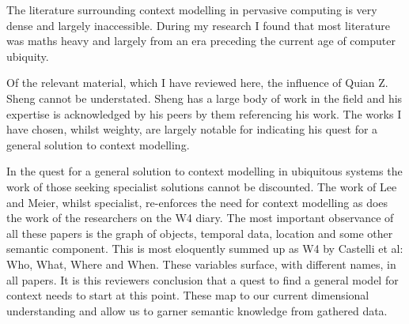 \documentclass[]{report}
\begin{document}
The literature surrounding context modelling in pervasive computing is very dense and largely inaccessible. During my research I found that most literature was maths heavy and largely from an era preceding the current age of computer ubiquity.\par
Of the relevant material, which I have reviewed here, the influence of Quian Z. Sheng cannot be understated. Sheng has a large body of work in the field and his expertise is acknowledged by his peers by them referencing his work. The works I have chosen\cite{6,7,8,9}, whilst weighty, are largely notable for indicating his quest for a general solution to context modelling.\par
In the quest for a general solution to context modelling in ubiquitous systems the work of those seeking specialist solutions cannot be discounted. The work of Lee and Meier\cite{0}, whilst specialist, re-enforces the need for context modelling as does the work of the researchers on the W4 diary\cite{2}. 
The most important observance of all these papers is the graph of objects, temporal data, location and some other semantic component. This is most eloquently summed up as W4 by Castelli et al\cite{2}: Who, What, Where and When. These variables surface, with different names, in all papers. It is this reviewers conclusion that a quest to find a general model for context needs to start at this point. These map to our current dimensional understanding and allow us to garner semantic knowledge from gathered data.
 
% 
%

\medskip
\end{document}
